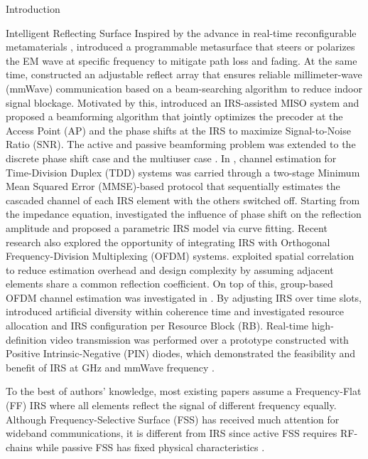 \documentclass{IEEEtran}
\begin{document}
\begin{section}{Introduction}
\begin{subsection}{Intelligent Reflecting Surface}
		Inspired by the advance in real-time reconfigurable metamaterials \cite{Cui2014}, \cite{Liaskos2018} introduced a programmable metasurface that steers or polarizes the EM wave at specific frequency to mitigate path loss and fading. At the same time, \cite{Tan2018} constructed an adjustable reflect array that ensures reliable millimeter-wave (mmWave) communication based on a beam-searching algorithm to reduce indoor signal blockage. Motivated by this, \cite{Wu2018,Wu2019} introduced an IRS-assisted MISO system and proposed a beamforming algorithm that jointly optimizes the precoder at the Access Point (AP) and the phase shifts at the IRS to maximize Signal-to-Noise Ratio (SNR). The active and passive beamforming problem was extended to the discrete phase shift case \cite{Wu2019a} and the multiuser case \cite{Guo2019a}. In \cite{Nadeem2019}, channel estimation for Time-Division Duplex (TDD) systems was carried through a two-stage Minimum Mean Squared Error (MMSE)-based protocol that sequentially estimates the cascaded channel of each IRS element with the others switched off. Starting from the impedance equation, \cite{Abeywickrama2019} investigated the influence of phase shift on the reflection amplitude and proposed a parametric IRS model via curve fitting. Recent research also explored the opportunity of integrating IRS with Orthogonal Frequency-Division Multiplexing (OFDM) systems. \cite{Yang2019} exploited spatial correlation to reduce estimation overhead and design complexity by assuming adjacent elements share a common reflection coefficient. On top of this, group-based OFDM channel estimation was investigated in \cite{Zheng2019}. By adjusting IRS over time slots, \cite{Yang2020} introduced artificial diversity within coherence time and investigated resource allocation and IRS configuration per Resource Block (RB). Real-time high-definition video transmission was performed over a prototype constructed with Positive Intrinsic-Negative (PIN) diodes, which demonstrated the feasibility and benefit of IRS at GHz and mmWave frequency \cite{Dai2020}.

		To the best of authors' knowledge, most existing papers assume a Frequency-Flat (FF) IRS where all elements reflect the signal of different frequency equally. Although Frequency-Selective Surface (FSS) has received much attention for wideband communications, it is different from IRS since active FSS requires RF-chains \cite{Kim2006,Xu2014} while passive FSS has fixed physical characteristics \cite{Anwar2018}.
	\end{subsection}


\end{section}
\end{document}
